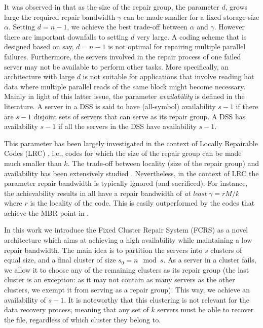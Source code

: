 \documentclass[journal,onecolumn,draftcls]{IEEEtran}
\begin{document}
It was observed in \cite{dimakis2010network} that as the size of the repair group, the parameter $d$,  grows large the required repair bandwidth $\gamma$ can be made smaller for a fixed storage size $\alpha$. Setting $d = n-1$, we achieve the best trade-off between $\alpha$ and $\gamma$. However there are important downfalls to setting $d$ very large. A coding scheme that is designed based on say, $d = n-1$ is not optimal for repairing multiple parallel failures. Furthermore, the servers involved in the repair process of one failed server may not be available to perform other tasks. More specifically, an architecture with large $d$ is not suitable for applications that involve reading hot data \cite{rawat2016locality,tamo2014bounds} where multiple parallel reads of the same block might become necessary. Mainly in light of this latter issue, the parameter {\it availability} is defined in the literature. A server in a DSS is said to have (all-symbol) availability $s-1$ if there are $s-1$ disjoint sets of servers that can serve as its repair group. A DSS has availability $s-1$ if all the servers in the DSS have availability $s-1$. 

This parameter has been largely investigated in the context of Locally Repairable Codes (LRC) \cite{papailiopoulos2014locally,sathiamoorthy2013xoring,tamo2016optimal}, i.e., codes for which the size of the repair group can be made much smaller than $k$. The trade-off between locality (size of the repair group) and availability has been extensively studied \cite{rawat2016locality,tamo2014bounds,pamies2013locally,wang2015achieving,huang2015linear}. Nevertheless, in the context of LRC the parameter repair bandwidth is typically ignored (and sacrificed).  For instance, the achievability results in \cite{rawat2016locality,tamo2014bounds,pamies2013locally,papailiopoulos2014locally} all have a repair bandwidth of {\it at least} $\gamma = rM/k$ where $r$ is the locality of the code. This is easily outperformed by the codes that achieve the MBR point in \cite{dimakis2010network,rashmi2011optimal}.

In this work we introduce the Fixed Cluster Repair System (FCRS) as a novel architecture which aims at achieving a high availability while maintaining a low repair bandwidth. The main idea is to partition the servers into $s$ clusters of equal size, and a final cluster of size $s_0 = n\mod s$. As a server in a cluster fails, we allow it to choose any of the remaining clusters as its repair group (the last cluster is an exception: as it may not contain as many servers as the other clusters, we exempt it from serving as a repair group). This way, we achieve an availability of $s-1$. It is noteworthy that this clustering is not relevant for the data recovery process, meaning that any set of $k$ servers must be able to recover the file, regardless of which cluster they belong to.   
\end{document}
